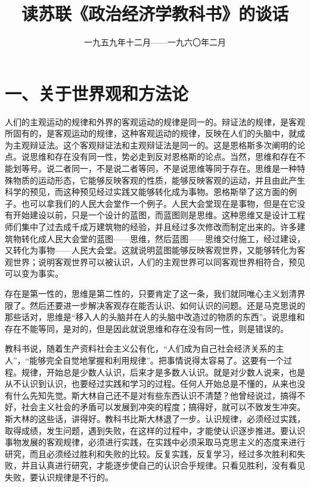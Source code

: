 
\title{读苏联《政治经济学教科书》的谈话}
\date{一九五九年十二月——一九六〇年二月}
\maketitle


\section{一、关于世界观和方法论}

人们的主观运动的规律和外界的客观运动的规律是同一的。辩证法的规律，是客观所固有的，是客观运动的规律，这种客观运动的规律，反映在人们的头脑中，就成为主观辩证法。这个客观辩证法和主观辩证法是同一的。这是恩格斯多次阐明的论点。说思维和存在没有同一性，势必走到反对恩格斯的论点。当然，思维和存在不能划等号。说二者同一，不是说二者等同，不是说思维等同于存在。思维是一种特殊物质的运动形态，它能够反映客观的性质，能够反映客观的运动，并且由此产生科学的预见，而这种预见经过实践又能够转化成为事物。恩格斯举了这方面的例子。也可以拿我们的人民大会堂作一个例子。人民大会堂现在是事物，但是在它没有开始建设以前，只是一个设计的蓝图，而蓝图则是思维。这种思维又是设计工程师们集中了过去成千成万建筑物的经验，并且经过多次修改而制定出来的。许多建筑物转化成人民大会堂的蓝图——思维，然后蓝图——思维交付施工，经过建设，又转化为事物——人民大会堂。这就说明蓝图能够反映客观世界，又能够转化为客观世界；说明客观世界可以被认识，人们的主观世界可以同客观世界相符合，预见可以变为事实。

存在是第一性的，思维是第二性的，只要肯定了这一条，我们就同唯心主义划清界限了。然后还要进一步解决客观存在能否认识、如何认识的问题。还是马克思说的那些话对，思维是“移入人的头脑并在人的头脑中改造过的物质的东西”。说思维和存在不能等同，是对的，但是因此就说思维和存在没有同一性，则是错误的。

教科书说，随着生产资料社会主义公有化，“人们成为自己社会经济关系的主人”，“能够完全自觉地掌握和利用规律”。把事情说得太容易了。这要有一个过程。规律，开始总是少数人认识，后来才是多数人认识。就是对少数人说来，也是从不认识到认识，也要经过实践和学习的过程。任何人开始总是不懂的，从来也没有什么先知先觉。斯大林自己还不是对有些东西认识不清楚？他曾经说过，搞得不好，社会主义社会的矛盾可以发展到冲突的程度；搞得好，就可以不致发生冲突。斯大林的这些话，讲得好。教科书比斯大林退了一步。认识规律，必须经过实践，取得成绩，发生问题，遇到失败，在这样的过程中，才能使认识逐步推进。要认识事物发展的客观规律，必须进行实践，在实践中必须采取马克思主义的态度来进行研究，而且必须经过胜利和失败的比较。反复实践，反复学习，经过多次胜利和失败，并且认真进行研究，才能逐步使自己的认识合乎规律。只看见胜利，没有看见失败，要认识规律是不行的。

